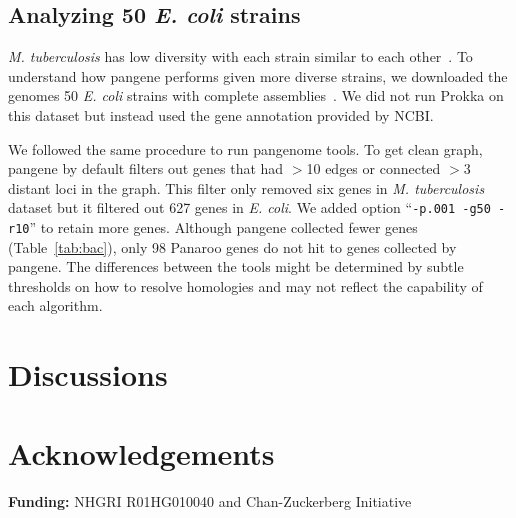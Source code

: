 \documentclass[webpdf,contemporary,large,namedate]{oup-authoring-template}%
\begin{document}
\subsection{Analyzing 50 \textit{E. coli} strains}

\emph{M. tuberculosis} has low diversity with each strain similar to each other~\citep{Marin:2022aa}.
To understand how pangene performs given more diverse strains,
we downloaded the genomes 50 \emph{E. coli} strains with complete assemblies~\citep{Shaw:2021aa}.
We did not run Prokka on this dataset but instead used the gene annotation provided by NCBI.

We followed the same procedure to run pangenome tools.
To get clean graph, pangene by default filters out genes that had $>$10 edges or connected $>$3 distant loci in the graph.
This filter only removed six genes in \emph{M. tuberculosis} dataset but
it filtered out 627 genes in \emph{E. coli}.
We added option ``{\tt -p.001 -g50 -r10}'' to retain more genes.
Although pangene collected fewer genes (Table~\ref{tab:bac}),
only 98 Panaroo genes do not hit to genes collected by pangene.
The differences between the tools might be determined by subtle thresholds on how to resolve homologies
and may not reflect the capability of each algorithm.

\section{Discussions}

\section{Acknowledgements}

{\bf Funding:} NHGRI R01HG010040 and Chan-Zuckerberg Initiative

%


\end{document}
